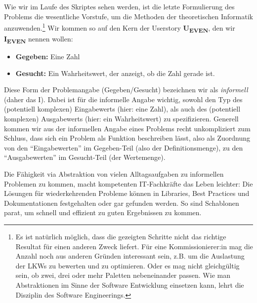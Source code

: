 Wie wir im Laufe des Skriptes sehen werden, ist die letzte Formulierung des Problems die 
wesentliche Vorstufe, um die Methoden der theoretischen Informatik anzuwenden.\footnote{
Es ist natürlich möglich,
dass die gezeigten Schritte nicht das richtige Resultat für einen anderen Zweck liefert.
Für eine Kommissionierer:in mag die Anzahl noch aus anderen Gründen interessant sein,
z.B. um die Auslastung der LKWs zu bewerten und zu optimieren.
Oder es mag nicht gleichgültig sein, ob zwei, drei oder mehr Paletten nebeneinander passen.
Wie man Abstraktionen im Sinne der Software Entwicklung einsetzen kann,
lehrt die Disziplin des Software Engineerings.}
Wir kommen so auf den Kern der Userstory \textbf{U\textsubscript{EVEN}},
den wir \textbf{I\textsubscript{EVEN}} nennen wollen:
\begin{itemize}
    \item \textbf{Gegeben:} Eine Zahl
    \item \textbf{Gesucht:} Ein Wahrheitswert, der anzeigt, ob die Zahl gerade ist. 
\end{itemize}
Diese Form der Problemangabe (Gegeben/Gesucht) bezeichnen wir als \emph{informell}
(daher das I).
Dabei ist für die informelle Angabe wichtig,
sowohl den Typ des (potentiell komplexen) Eingabewerts (hier: eine Zahl),
als auch des (potentiell komplexen) Ausgabewerts (hier: ein Wahrheitswert) zu spezifizieren.
Generell kommen wir aus der informellen Angabe eines Problems recht unkompliziert zum Schluss,
dass sich ein Problem als Funktion beschreiben lässt,
also als Zuordnung von den ``Eingabewerten'' im Gegeben-Teil
(also der Definitionsmenge),
zu den ``Ausgabewerten'' im Gesucht-Teil
(der Wertemenge).

Die Fähigkeit via Abstraktion von vielen Alltagsaufgaben zu informellen Problemen zu kommen,
macht kompetenten IT-Fachkräfte das Leben leichter:
Die Lösungen für wiederkehrenden Probleme können
in Libraries, Best Practices und Dokumentationen festgehalten oder gar gefunden werden.
So sind Schablonen parat,
um schnell und effizient zu guten Ergebnissen zu kommen.

